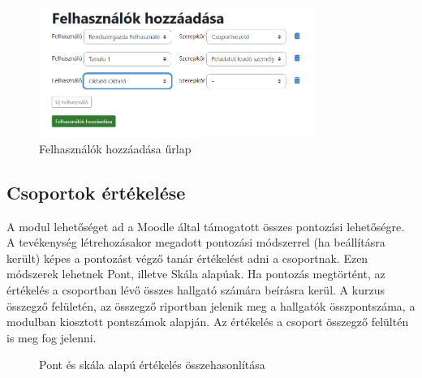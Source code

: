 \begin{figure}[H]
	\centering
	\includegraphics[width=0.8\textwidth,frame]{images/felhasznalok_hozzaadasa.png}
	\caption{Felhasználók hozzáadása űrlap}
\end{figure}

\subsection{Csoportok értékelése}

A modul lehetőséget ad a Moodle által támogatott összes pontozási lehetőségre. A tevékenység létrehozásakor megadott pontozási módszerrel (ha beállításra került) képes a pontozást végző tanár értékelést adni a csoportnak. Ezen módszerek lehetnek Pont, illetve Skála alapúak. Ha pontozás megtörtént, az értékelés a csoportban lévő összes hallgató számára beírásra kerül. A kurzus összegző felületén, az összegző riportban jelenik meg a hallgatók összpontszáma, a modulban kiosztott pontszámok alapján. Az értékelés a csoport összegző felültén is meg fog jelenni.

\begin{figure}[H]
	\centering
	\hspace{5pt}
	\caption{Pont és skála alapú értékelés összehasonlítása}
	\label{fig:example-2}
\end{figure}

